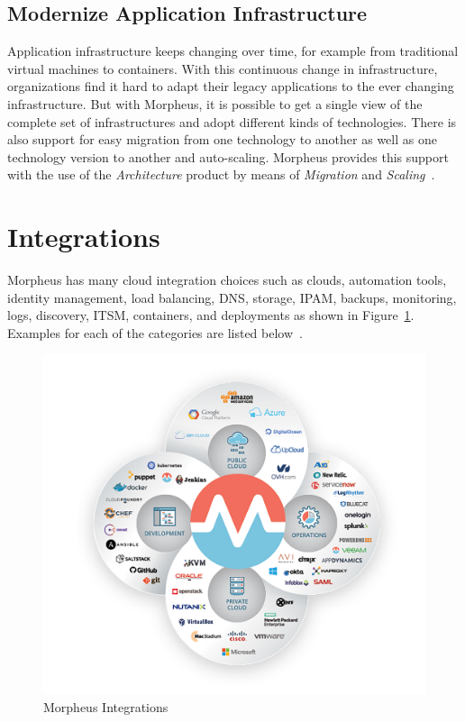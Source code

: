 \subsection{Modernize Application Infrastructure}

Application infrastructure keeps changing over time, for example from
traditional virtual machines to containers. With this continuous change in
infrastructure, organizations find it hard to adapt their legacy applications
to the ever changing infrastructure. But with Morpheus, it is possible to get a
single view of the complete set of infrastructures and adopt different kinds of
technologies. There is also support for easy migration from one technology to
another as well as one technology version to another and auto-scaling. Morpheus
provides this support with the use of the \textit{Architecture} product by
means of \textit{Migration} and
\textit{Scaling}~\cite{hid-sp18-416-www-morpheus-product-guide}.

\section{Integrations} 
\label{sec:integrations}

Morpheus has many cloud integration choices such as clouds, automation tools,
identity management, load balancing, DNS, storage, IPAM, backups, monitoring,
logs, discovery, ITSM, containers, and deployments as shown in
Figure~\ref{fig:integrations}. Examples for each of the categories are listed
below~\cite{hid-sp18-416-www-morpheus-integrations}.

\begin{figure}[htb] 
	\centering
	\includegraphics[width=\columnwidth]{../images/MorpheusIntegrations.png}
	\caption{Morpheus 
	Integrations~\cite{hid-sp18-416-www-morpheus-product-guide}}
\label{fig:integrations} 
\end{figure}

